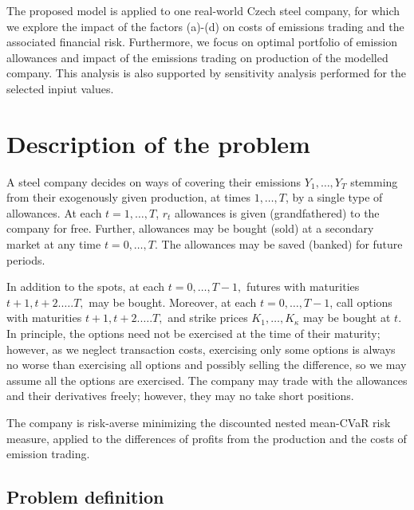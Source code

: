 \documentclass[3p,times]{elsarticle}
\begin{document}
The proposed model is applied to one real-world Czech steel company, for which we explore the impact of the factors (a)-(d) on costs of emissions trading and the associated financial risk. Furthermore, we focus on optimal portfolio of emission allowances and impact of the emissions trading on production of the modelled company. This analysis is also supported by sensitivity analysis performed for the selected inpiut values. 




\section*{Description of the problem}

A steel company decides on ways of covering their emissions $Y_{1},\dots,Y_{T}$ stemming from their exogenously given production, at times $1,\dots,T$,
by a single type of allowances. At each $t=1,\dots,T$, $r_{t}$ allowances
is given (grandfathered) to the company for free. Further, allowances
may be bought (sold) at a secondary market at any time $t=0,\dots,T$.
The allowances may be saved (banked) for future periods. 

In addition to the spots, at each $t=0,\dots,T-1,$ futures with maturities
$t+1,t+2.\dots.T,$ may be bought. Moreover, at each $t=0,\dots,T-1$, call options with maturities $t+1,t+2.\dots.T,$
and strike prices $K_{1},\dots,K_{\kappa}$ may be bought at $t$.
In principle, the options
need not be exercised at the time of their maturity; however, as we neglect transaction costs, exercising only some options is
always no worse than exercising all options and possibly selling the
difference, so we may assume all the options are exercised. The company may trade with the allowances and their derivatives freely; however, they may no take short positions.


The company is risk-averse minimizing the discounted nested mean-CVaR
risk measure, applied to the differences of profits from the production and the costs of emission trading. 

\subsection*{Problem definition}
\end{document}
